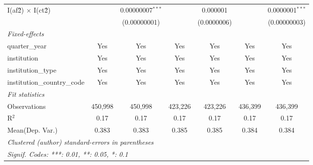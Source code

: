 \begin{tabular}{lcccccc}
   I(af\^2) $\times$ I(ct\^2)         &               & 0.00000007$^{***}$ &               & 0.000001       &               & 0.0000001$^{***}$\\   
                                      &               & (0.00000001)       &               & (0.0000006)    &               & (0.00000003)\\   
   \midrule
   \emph{Fixed-effects}\\
   quarter\_year                      & Yes           & Yes                & Yes           & Yes            & Yes           & Yes\\  
   institution                        & Yes           & Yes                & Yes           & Yes            & Yes           & Yes\\  
   institution\_type                  & Yes           & Yes                & Yes           & Yes            & Yes           & Yes\\  
   institution\_country\_code         & Yes           & Yes                & Yes           & Yes            & Yes           & Yes\\  
   \midrule
   \emph{Fit statistics}\\
   Observations                       & 450,998       & 450,998            & 423,226       & 423,226        & 436,399       & 436,399\\  
   R$^2$                              & 0.17          & 0.17               & 0.17          & 0.17           & 0.17          & 0.17\\  
Mean(Dep. Var.) & 0.383 & 0.383 & 0.385 & 0.385 & 0.384 & 0.384 \\
   \midrule \midrule
   \multicolumn{7}{l}{\emph{Clustered (author) standard-errors in parentheses}}\\
   \multicolumn{7}{l}{\emph{Signif. Codes: ***: 0.01, **: 0.05, *: 0.1}}\\
\end{tabular}
\par\endgroup
